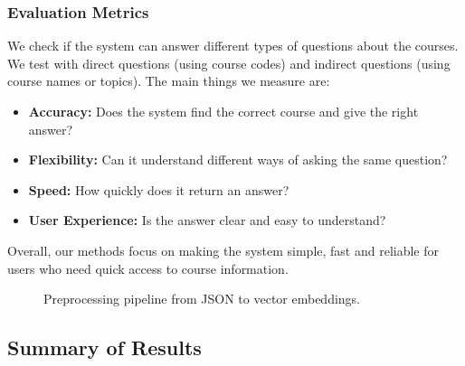 \documentclass[conference]{IEEEtran}
\begin{document}
\subsubsection{\textbf{Evaluation Metrics}}
We check if the system can answer different types of questions about the courses. We test with direct questions (using course codes) and indirect questions (using course names or topics). The main things we measure are:
\begin{itemize}
    \item \textbf{Accuracy:} Does the system find the correct course and give the right answer?
    \item \textbf{Flexibility:} Can it understand different ways of asking the same question?
    \item \textbf{Speed:} How quickly does it return an answer?
    \item \textbf{User Experience:} Is the answer clear and easy to understand?
\end{itemize}
Overall, our methods focus on making the system simple, fast and reliable for users who need quick access to course information.

\begin{figure}[t!]
\centering
{}
\caption{Preprocessing pipeline from JSON to vector embeddings.}
\label{fig:qual_preproc}
\end{figure}

\subsection{\textbf{Summary of Results}}
\end{document}
